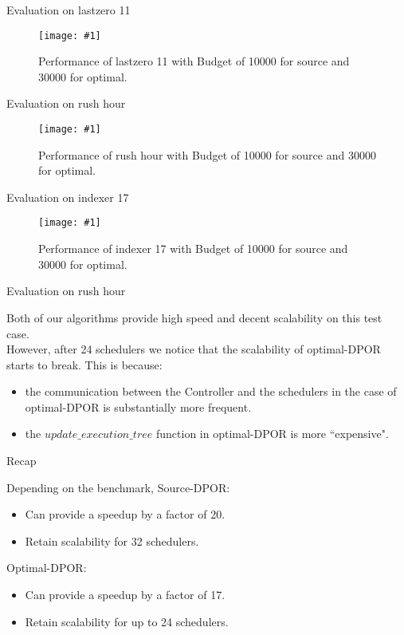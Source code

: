 \documentclass[9pt]{beamer}
\newcommand{\tracelong}[2]{
\begin{figure}[H]
\centering
\texttt{[image: \#1]}
\caption{#2}
\label{#2}
\end{figure}
}
\newcommand{\customGraph}[2]{
\begin{figure}[H]
\centering
\texttt{[image: \#1]}
\caption{#2}
\label{#2}
\end{figure}
}
\begin{document}
\iffalse
\begin{frame}{Evaluation on rush hour}


\tracelong{../img/rushhour.png}{Input of rush hour}


\end{frame}
\fi

\begin{frame}{Evaluation on lastzero 11}

\customGraph{../scripts/lastzero_11_10000_combo_time.png}{Performance of lastzero 11 with Budget of 10000 for source and 30000 for optimal.}


\end{frame}

\begin{frame}{Evaluation on rush hour}

\customGraph{../scripts/rush_hour_10000_combo_time.png}{Performance of rush hour with Budget of 10000 for source and 30000 for optimal.}


\end{frame}

\begin{frame}{Evaluation on indexer 17}

\customGraph{../scripts/indexer_17_10000_combo_time.png}{Performance of indexer 17 with Budget of 10000 for source and 30000 for optimal.}


\end{frame}

\begin{frame}{Evaluation on rush hour}

Both of our algorithms provide high speed and decent scalability on this test case.
\\
However, after 24 schedulers we notice that the scalability of optimal-DPOR starts to break. This is because:

\begin{itemize}[<+->]
\item the communication between the Controller and the schedulers in the case of optimal-DPOR is substantially more frequent.
\item the $update\_execution\_tree$ function in optimal-DPOR is more ``expensive".
\end{itemize}

\end{frame}

\begin{frame}{Recap}

Depending on the benchmark, Source-DPOR:
\begin{itemize}[<+->]
\item Can provide a speedup by a factor of 20.
\item Retain scalability for 32 schedulers.
\end{itemize}
\pause
Optimal-DPOR:
\begin{itemize}[<+->]
\item Can provide a speedup by a factor of 17.
\item Retain scalability for up to 24 schedulers.
\end{itemize}


\end{frame}
\end{document}
